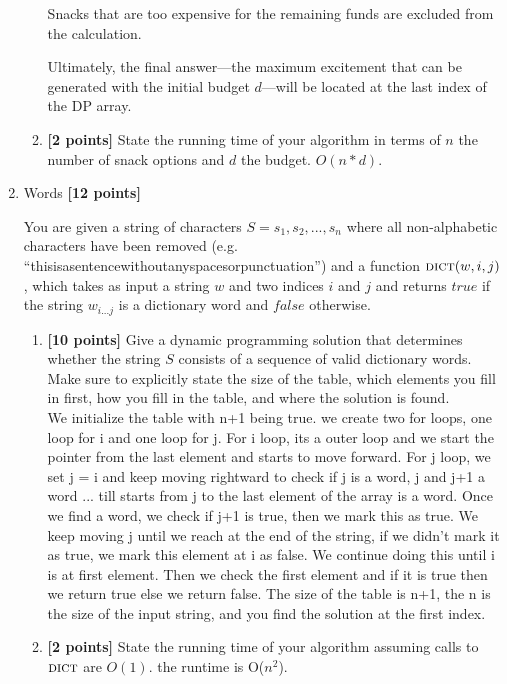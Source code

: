 \documentclass[11pt]{article}
\begin{document}
\begin{enumerate}
\begin{enumerate}
Snacks that are too expensive for the remaining funds are excluded from the calculation.

Ultimately, the final answer—the maximum excitement that can be generated with the initial budget \( d \)—will be located at the last index of the DP array.

\item \textbf{[2 points]} State the running time of your algorithm in terms of $n$ the number of snack options and $d$ the budget. $O(n*d)$.
	
\end{enumerate}

\item Words \textbf{[12 points]} 

You are given a string of characters $S = s_1, s_2, ..., s_n$ where all non-alphabetic characters have been removed (e.g. ``thisisasentencewithoutanyspacesorpunctuation'') and a function $\textsc{dict}(w,i,j)$, which takes as input a string $w$ and two indices $i$ and $j$ and returns $true$ if the string $w_{i...j}$ is a dictionary word and $false$ otherwise.

\begin{enumerate}
	
	\item \textbf{[10 points]} Give a dynamic programming solution that determines whether the string $S$ consists of a sequence of valid dictionary words.  Make sure to explicitly state the size of the table, which elements you fill in first, how you fill in the table, and where the solution is found.\\ 
We initialize the table with n+1 being true.  
we create two for loops, one loop for i and one loop for j. For i loop, its a outer loop and we start the pointer from the last element and starts to move forward. For j loop, we set j = i and keep moving rightward to check if j is a word, j and j+1 a word ... till starts from j to the last element of the array is a word. Once we find a word, we check if j+1 is true, then we mark this as true.  We keep moving j until we reach at the end of the string, if we didn't mark it as true,  we mark this element at i as false. We continue doing this until i is at first element. Then we check the first element and if it is true then we return true else we return false.  The size of the table is n+1, the n is the size of the input string, and you find the solution at the first index.
	
	\item \textbf{[2 points]} State the running time of your algorithm assuming calls to $\textsc{dict}$ are $O(1)$.
the runtime is O($n^2$).


\end{enumerate}
\end{enumerate}
\end{document}
